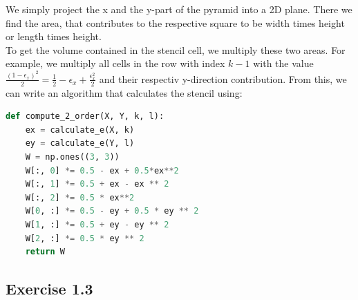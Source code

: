 \documentclass{scrartcl}
\begin{document}
We simply project the x and the y-part of the pyramid into a 2D plane. There we find the area, that contributes to the respective square to be width times height or length times height. \\To get the volume contained in the stencil cell, we multiply these two areas. For example, we multiply all cells in the row with index \( k-1 \) with the value 
\( \frac{(1-\epsilon_x)^2}{2} = \frac{1}{2} - \epsilon_x + \frac{\epsilon_x^2}{2}\) and their respectiv y-direction contribution.
From this, we can write an algorithm that calculates the stencil using:
\begin{lstlisting}[title=Function to calculate the 2nd order., language=Python, frame=single]
def compute_2_order(X, Y, k, l):
	ex = calculate_e(X, k)
	ey = calculate_e(Y, l)
	W = np.ones((3, 3))
	W[:, 0] *= 0.5 - ex + 0.5*ex**2
	W[:, 1] *= 0.5 + ex - ex ** 2
	W[:, 2] *= 0.5 * ex**2
	W[0, :] *= 0.5 - ey + 0.5 * ey ** 2
	W[1, :] *= 0.5 + ey - ey ** 2
	W[2, :] *= 0.5 * ey ** 2
	return W
\end{lstlisting}

\subsection*{Exercise 1.3}
\end{document}
